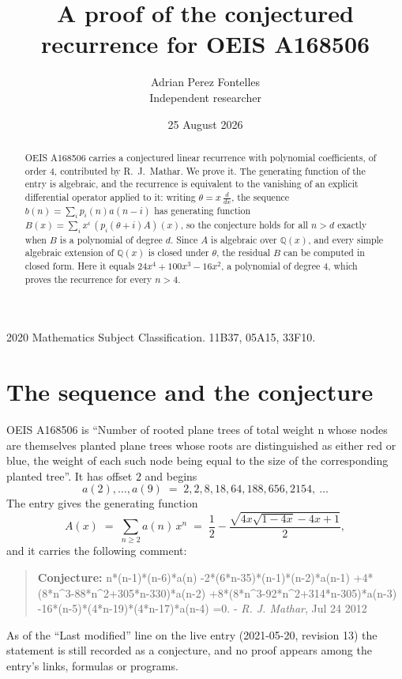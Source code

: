\documentclass[11pt,a4paper]{article}
\title{A proof of the conjectured recurrence for OEIS A168506}
\author{Adrian Perez Fontelles\\ \small Independent researcher}
\date{25 August 2026}
\theoremstyle{plain}
\theoremstyle{definition}
\begin{document}
\maketitle

\begin{abstract}
OEIS A168506 carries a conjectured linear recurrence with polynomial coefficients, of
order 4, contributed by R.~J.~Mathar. We prove it. The generating function of the
entry is algebraic, and the recurrence is equivalent to the vanishing of an explicit
differential operator applied to it: writing $\theta=x\,\frac{d}{dx}$, the sequence
$b(n)=\sum_{i}p_{i}(n)a(n-i)$ has generating function
$B(x)=\sum_{i}x^{i}\,(p_{i}(\theta+i)A)(x)$, so the conjecture holds for all $n>d$ exactly
when $B$ is a polynomial of degree $d$. Since $A$ is algebraic over $\mathbb{Q}(x)$, and every simple
algebraic extension of $\mathbb{Q}(x)$ is closed under $\theta$, the residual $B$ can be
computed in closed form. Here it equals $24 x^{4} + 100 x^{3} - 16 x^{2}$, a polynomial of degree $4$, which proves
the recurrence for every $n>4$.
\end{abstract}

\noindent\small 2020 Mathematics Subject Classification. 11B37, 05A15, 33F10.\normalsize

\section{The sequence and the conjecture}

OEIS A168506 is ``Number of rooted plane trees of total weight n whose nodes are themselves planted plane trees whose roots are distinguished as either red or blue, the weight of each such node being equal to the size of the corresponding planted tree''. It has offset $2$ and begins
\[
a(2),\dots,a(9)\;=\;2, 2, 8, 18, 64, 188, 656, 2154,\ \dots
\]
The entry gives the generating function
\begin{equation}\label{eq:gf}
A(x)\;=\;\sum_{n\ge 2} a(n)\,x^{n}\;=\;\frac{1}{2} - \frac{\sqrt{4 x \sqrt{1 - 4 x} - 4 x + 1}}{2} ,
\end{equation}
and it carries the following comment:
\begin{quote}\small
\textbf{Conjecture:} n*(n-1)*(n-6)*a(n) -2*(6*n-35)*(n-1)*(n-2)*a(n-1) +4*(8*n\^{}3-88*n\^{}2+305*n-330)*a(n-2) +8*(8*n\^{}3-92*n\^{}2+314*n-305)*a(n-3) -16*(n-5)*(4*n-19)*(4*n-17)*a(n-4) =0. - \emph{R. J. Mathar}, Jul 24 2012
\end{quote}
As of the ``Last modified'' line on the live entry (2021-05-20, revision 13) the
statement is still recorded as a conjecture, and no proof appears among the entry's links,
formulas or programs.
\end{document}
